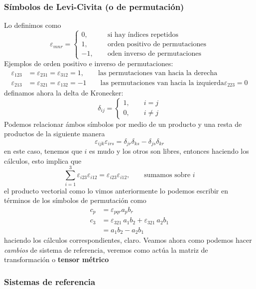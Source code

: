 \documentclass[11pt,a4paper]{article}
\begin{document}
\subsubsection{Símbolos de Levi-Civita (o de permutación)}

Lo definimos como 
$$\varepsilon_{mnr}=\begin{cases}
0,\qquad &\text{si hay índices repetidos}\\
1, &\text{orden positivo de permutaciones}\\
-1, &\text{oden inverso de permutaciones}
\end{cases}$$
Ejemplos de orden positivo e inverso de permutaciones:
\begin{align*}
\varepsilon_{123}&=\varepsilon_{231}=\varepsilon_{312}=1,\qquad \text{las permutaciones van hacia la derecha}\\
\varepsilon_{213}&=\varepsilon_{321}=\varepsilon_{132}=-1\qquad \text{las permutaciones van hacia la izquierda}
\varepsilon_{223}=0
\end{align*}
definamos ahora la delta de Kronecker:
$$\delta_{ij}=\begin{cases}
1,\qquad i=j\\
0,\qquad i\neq j
\end{cases}$$
Podemos relacionar ámbos símbolos por medio de un producto y una resta de productos de la siguiente manera
$$\varepsilon_{ijk}\varepsilon_{irs}=\delta_{jr}\delta_{ks}-\delta_{js}\delta_{kr}$$
en este caso, tenemos que $i$ es mudo y los otros son libres, entonces haciendo los cálculos, esto implica que
$$\sum_{i=1}^{3}\varepsilon_{i23}\varepsilon_{i12}=\varepsilon_{i23}\varepsilon_{i12},\qquad\text{sumamos sobre }i$$
el producto vectorial como lo vimos anteriormente lo podemos escribir en términos de los símbolos de permutación como
\begin{align*}
c_p&=\varepsilon_{pqr}a_pb_r\\
c_3&=\varepsilon_{321}\ a_1b_2+\varepsilon_{321}\ a_2b_1\\
&=a_1b_2-a_2b_1
\end{align*}
haciendo los cálculos correspondientes, claro. Veamos ahora como podemos hacer \emph{cambios} de sistema de referencia, veremos como actúa la matriz de transformación o \textbf{tensor métrico}

\subsubsection{Sistemas de referencia}
\end{document}
